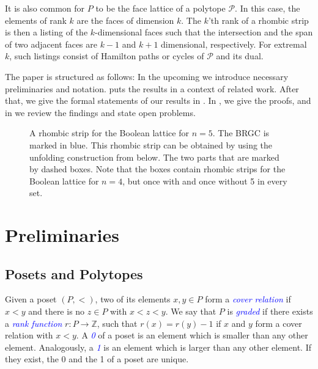 \documentclass[fontsize=11pt,a4paper,DIV=12]{scrartcl}
\newcommand{\defn}[1]{\textsl{\textcolor{Blue}{#1}}}
\begin{document}
It is also common for $P$ to be the face lattice of a polytope $\mathcal P$. In this case, the elements of rank $k$ are the faces of dimension $k$. The $k$'th rank of a rhombic strip is then a listing of the $k$-dimensional faces such that the intersection and the span of two adjacent faces are $k-1$ and $k+1$ dimensional, respectively. For extremal $k$, such listings consist of Hamilton paths or cycles of $\mathcal P$ and its dual.

The paper is structured as follows: In the upcoming  we introduce necessary preliminaries and notation.  puts the results in a context of related work. After that, we give the formal statements of our results in . In , we give the proofs, and in  we review the findings and state open problems.

\begin{figure}
    \centering
    
    \caption{A rhombic strip for the Boolean lattice for $n=5$. The BRGC is marked in blue. This rhombic strip can be obtained by using the unfolding construction from below. The two parts that are marked by dashed boxes. Note that the boxes contain rhombic strips for the Boolean lattice for $n=4$, but once with and once without 5 in every set.}
    \label{fig:boolean with brgc}
\end{figure}

\section{Preliminaries}\label{sec:prelim}

\subsection{Posets and Polytopes}
Given a poset $(P,<)$, two of its elements $x,y\in P$ form a \defn{cover relation} if $x<y$ and there is no $z\in P$ with $x<z<y$. We say that $P$ is \defn{graded} if there exists a \defn{rank function} $r\colon P\to\mathbb Z$, such that $r(x)=r(y)-1$ if $x$ and $y$ form a cover relation with $x<y$. A \defn{0} of a poset is an element which is smaller than any other element. Analogously, a \defn{1} is an element which is larger than any other element. If they exist, the 0 and the 1 of a poset are unique.
\end{document}
